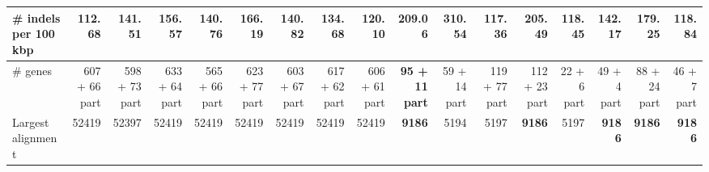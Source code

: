 \documentclass[12pt,a4paper]{article}
\begin{document}
\begin{table}[ht]
\begin{center}
\begin{tabular}{|l*{16}{|r}|}
\# indels per 100 kbp & {\bf 112.68} & 141.51 & 156.57 & 140.76 & 166.19 & 140.82 & 134.68 & 120.10 & 209.06 & 310.54 & 117.36 & 205.49 & 118.45 & 142.17 & 179.25 & 118.84 \\ \hline
\# genes & 607 + 66 part & 598 + 73 part & 633 + 64 part & 565 + 66 part & 623 + 77 part & 603 + 67 part & 617 + 62 part & 606 + 61 part & {\bf 95 + 11 part} & 59 + 14 part & 119 + 77 part & 112 + 23 part & 22 + 6 part & 49 + 4 part & 88 + 24 part & 46 + 7 part \\ \hline
Largest alignment & 52419 & 52397 & 52419 & 52419 & 52419 & 52419 & 52419 & 52419 & {\bf 9186} & 5194 & 5197 & {\bf 9186} & 5197 & {\bf 9186} & {\bf 9186} & {\bf 9186} \\ \hline
\end{tabular}
\end{center}
\end{table}
\end{document}
